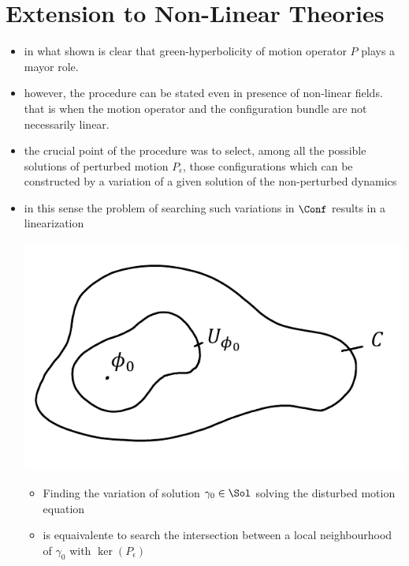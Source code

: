 \documentclass[a4paper,11pt]{scrartcl}
\begin{document}
    \section{Extension to Non-Linear Theories}
    \begin{itemize}
        \item in what shown is clear that green-hyperbolicity of motion operator $P$ plays a mayor role.
        \item however, the procedure can be stated even in presence of non-linear fields.\\
        that is when the motion operator and the configuration bundle are not necessarily linear.
        \item the crucial point of the procedure was to select, among all the possible solutions of perturbed motion $P_\epsilon$, those configurations which can be constructed by a variation of a given solution of the non-perturbed dynamics
        \item in this sense the problem of searching such variations in $\Conf$ results in a linearization\\
        \begin{minipage}{0.4\textwidth}
                   \includegraphics[width=\textwidth]{../Pictures/Linearization} 
        \end{minipage}
        \begin{minipage}{0.5\textwidth}
            \begin{itemize} 
                \item Finding the variation of solution $\gamma_0\in \Sol$ solving the disturbed motion equation
                \item is equaivalente to search the intersection between a local neighbourhood of $\gamma_0$ with $\ker(P_\epsilon)$

\end{itemize}
\end{minipage}
\end{itemize}
\end{document}
